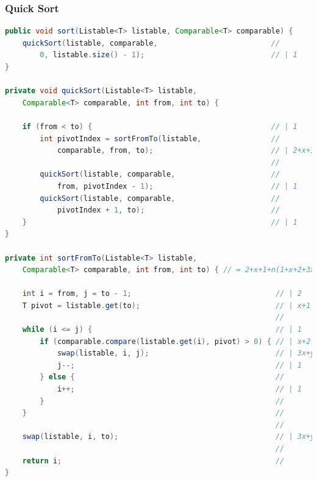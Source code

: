\documentclass[a4paper, 11pt]{article}
\begin{document}
\pagebreak

\subsubsection*{Quick Sort}

\begin{lstlisting}[language=java]
public void sort(Listable<T> listable, Comparable<T> comparable) {
    quickSort(listable, comparable,                          //
        0, listable.size() - 1);                             // | 1
}

private void quickSort(Listable<T> listable,
    Comparable<T> comparable, int from, int to) {                                              |
                                                                                               |
    if (from < to) {                                         // | 1                            |
        int pivotIndex = sortFromTo(listable,                //                                |
            comparable, from, to);                           // | 2+x+1+n(1+x+2+3x+y+1+1)+3x+y |
                                                             //                                |
        quickSort(listable, comparable,                      //                                | log(n)
            from, pivotIndex - 1);                           // | 1                            |
        quickSort(listable, comparable,                      //                                |
            pivotIndex + 1, to);                             //                                |
    }                                                        // | 1                            |
}                                                                                              |

private int sortFromTo(Listable<T> listable,
    Comparable<T> comparable, int from, int to) { // = 2+x+1+n(1+x+2+3x+y+1+1)+3x+y

    int i = from, j = to - 1;                                 // | 2
    T pivot = listable.get(to);                               // | x+1
                                                              //
    while (i <= j) {                                          // | 1    |
        if (comparable.compare(listable.get(i), pivot) > 0) { // | x+2  |
            swap(listable, i, j);                             // | 3x+y |
            j--;                                              // | 1    | n
        } else {                                              //        |
            i++;                                              // | 1    |
        }                                                     //        |
    }                                                         //        |
                                                              //
    swap(listable, i, to);                                    // | 3x+y
                                                              //
    return i;                                                 //
}


\end{lstlisting}
\end{document}
